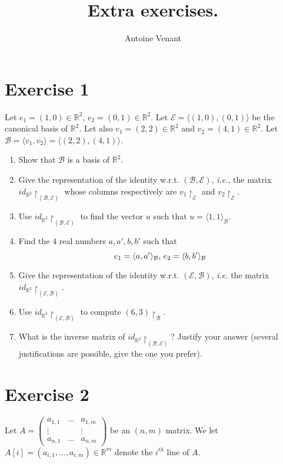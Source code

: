 \documentclass{article}
\title{Extra exercises.}
\author{Antoine Venant}
\begin{document}
\maketitle

\section*{Exercise 1}
Let $e_1 = (1,0) \in \mathbb{R}^2$, $e_2 = (0,1) \in \mathbb{R}^2$. Let $\mathcal{E} = \langle (1,0), (0,1) \rangle$ be the canonical basis of $\mathbb{R}^{2}$.
Let also $v_1 = (2,2) \in \mathbb{R}^2$ and $v_2 = (4,1) \in \mathbb{R}^2$. Let $\mathcal{B} = \langle v_1, v_2 \rangle = \langle (2,2), (4,1) \rangle$. 
\begin{enumerate}
\item Show that $\mathcal{B}$ is a basis of $\mathbb{R}^2$.
\item Give the representation of the identity w.r.t. $(\mathcal{B}, \mathcal{E})$, \emph{i.e.}, the matrix $id_{\mathbb{R}^2} \restriction_{(\mathcal{B}, \mathcal{E})}$ whose columns respectively are $v_1 \restriction_{\mathcal{E}}$ and $v_2 \restriction_{\mathcal{E}}$.
\item Use $id_{\mathbb{R}^2} \restriction_{(\mathcal{B}, \mathcal{E})}$ to find the vector $u$ such that $u = \langle 1,1 \rangle_{\mathcal{B}}$.
\item  Find the 4 real numbers $a, a', b, b'$ such that 
  \[ e_1 = \langle a, a' \rangle_{\mathcal{B}}\textnormal{, } e_2 = \langle b, b' \rangle_{\mathcal{B}} \]
\item Give the representation of the identity w.r.t. $(\mathcal{E}, \mathcal{B})$, \emph{i.e.} the matrix $id_{\mathbb{R}^2} \restriction_{(\mathcal{E}, \mathcal{B})}$.
\item Use $id_{\mathbb{R}^2} \restriction_{(\mathcal{E}, \mathcal{B})}$ to compute $(6,3) \restriction_{\mathcal{B}}$.
\item What is the inverse matrix of $id_{\mathbb{R}^2} \restriction_{(\mathcal{B}, \mathcal{E})}$? Justify your answer (several justifications are possible, give the one you prefer).
\end{enumerate}

\section*{Exercise 2}
Let $A = \begin{pmatrix} a_{1,1} & \dots & a_{1,m} \\ \vdots &  & \vdots \\ a_{n,1} & \dots & a_{n,m} \end{pmatrix}$ be an $(n,m)$ matrix. We let $A[i] = (a_{i,1}, \dots, a_{i,m}) \in \mathbb{R}^m$ denote the $i^{th}$ line of $A$. 
\end{document}
